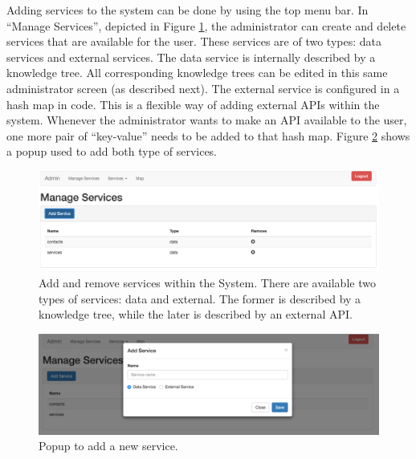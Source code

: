Adding services to the system can be done by using the top menu bar.
In ``Manage Services'', depicted in Figure \ref{fig:sys_mang_serv}, the administrator can create and delete services that are available for the user.
These services are of two types: data services and external services.
The data service is internally described by a knowledge tree.
All corresponding knowledge trees can be edited in this same administrator screen (as described next).
The external service is configured in a hash map in code.
This is a flexible way of adding external APIs within the system.
Whenever the administrator wants to make an API available to the user, one more pair of ``key-value'' needs to be added to that hash map.
Figure \ref{fig:sys_add_serv} shows a popup used to add both type of services.

\begin{figure}[htbp]
\begin{center}
\includegraphics[width=\textwidth]{figures/manage_serv.png}
\caption{Add and remove services within the System. There are available two types of services: data and external. The former is described by a knowledge tree, while the later is described by an external API.}
\label{fig:sys_mang_serv}
\end{center}
\end{figure}

\begin{figure}[htbp]
\begin{center}
\includegraphics[width=\textwidth]{figures/add_serv.png}
\caption{Popup to add a new service.}
\label{fig:sys_add_serv}
\end{center}
\end{figure}

